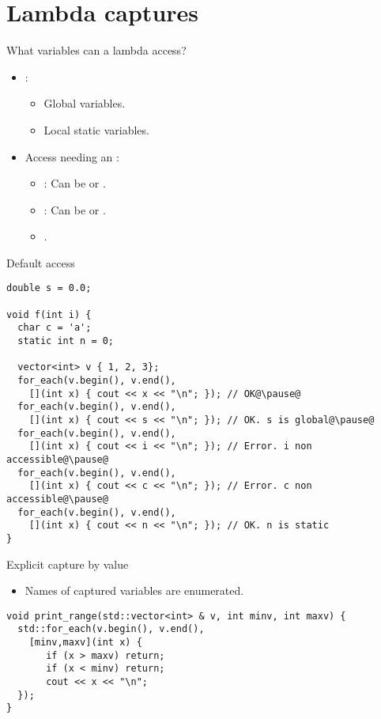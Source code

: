 \section{Lambda captures}

\begin{frame}[t,fragile]{What variables can a lambda access?}
  \begin{itemize}
    \item {}:
      \begin{itemize}
        \item Global variables.
        \item Local static variables.
      \end{itemize}
    \item Access needing an :
      \begin{itemize}
        \item {}: 
              Can be  or .
        \item {}: 
              Can be  or .
        \item {} .
      \end{itemize}
  \end{itemize}
\end{frame}

\begin{frame}[t,fragile]{Default access}
\begin{lstlisting}[escapechar=@]
double s = 0.0;

void f(int i) {
  char c = 'a';
  static int n = 0;

  vector<int> v { 1, 2, 3};
  for_each(v.begin(), v.end(),
    [](int x) { cout << x << "\n"; }); // OK@\pause@
  for_each(v.begin(), v.end(),
    [](int x) { cout << s << "\n"; }); // OK. s is global@\pause@
  for_each(v.begin(), v.end(),
    [](int x) { cout << i << "\n"; }); // Error. i non accessible@\pause@
  for_each(v.begin(), v.end(),
    [](int x) { cout << c << "\n"; }); // Error. c non accessible@\pause@
  for_each(v.begin(), v.end(),
    [](int x) { cout << n << "\n"; }); // OK. n is static
}
\end{lstlisting}
\end{frame}

\begin{frame}[t,fragile]{Explicit capture by value}
  \begin{itemize}
    \item Names of captured variables are enumerated.
  \end{itemize}
\pause
\begin{lstlisting}
void print_range(std::vector<int> & v, int minv, int maxv) {
  std::for_each(v.begin(), v.end(),
    [minv,maxv](int x) { 
       if (x > maxv) return;
       if (x < minv) return;
       cout << x << "\n";
  });
}
\end{lstlisting}
\end{frame}

